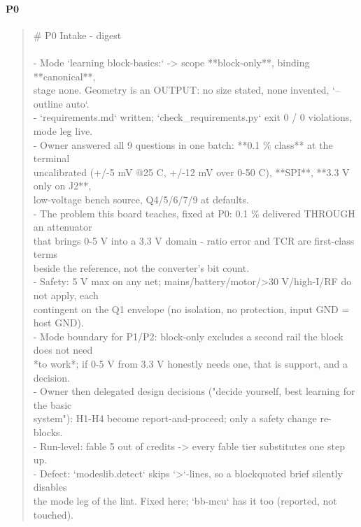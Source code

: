 \documentclass[11pt,a4paper]{article}
\begin{document}
\paragraph*{P0}
\begin{quote}\small\ttfamily\raggedright
\# P0 Intake - digest\\
~\\
- Mode `learning block-basics:` -\textgreater{} scope {*}{*}block-only{*}{*}, binding {*}{*}canonical{*}{*},\\
  stage none. Geometry is an OUTPUT: no size stated, none invented, `--outline auto`.\\
- `requirements.md` written; `check\_requirements.py` exit 0 / 0 violations, mode leg live.\\
- Owner answered all 9 questions in one batch: {*}{*}0.1 \% class{*}{*} at the terminal\\
  uncalibrated (+/-5 mV @25 C, +/-12 mV over 0-50 C), {*}{*}SPI{*}{*}, {*}{*}3.3 V only on J2{*}{*},\\
  low-voltage bench source, Q4/5/6/7/9 at defaults.\\
- The problem this board teaches, fixed at P0: 0.1 \% delivered THROUGH an attenuator\\
  that brings 0-5 V into a 3.3 V domain - ratio error and TCR are first-class terms\\
  beside the reference, not the converter's bit count.\\
- Safety: 5 V max on any net; mains/battery/motor/\textgreater{}30 V/high-I/RF do not apply, each\\
  contingent on the Q1 envelope (no isolation, no protection, input GND = host GND).\\
- Mode boundary for P1/P2: block-only excludes a second rail the block does not need\\
  {*}to work{*}; if 0-5 V from 3.3 V honestly needs one, that is support, and a decision.\\
- Owner then delegated design decisions ("decide yourself, best learning for the basic\\
  system"): H1-H4 become report-and-proceed; only a safety change re-blocks.\\
- Run-level: fable 5 out of credits -\textgreater{} every fable tier substitutes one step up.\\
- Defect: `modeslib.detect` skips `\textgreater{}`-lines, so a blockquoted brief silently disables\\
  the mode leg of the lint. Fixed here; `bb-mcu` has it too (reported, not touched).
\end{quote}
\end{document}
